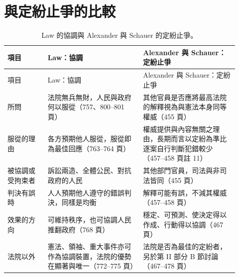 \section{與定紛止爭的比較}
\label{sec:60_coordination-2}

\begin{longtable}{@{}L{0.16\linewidth}L{0.38\linewidth}L{0.38\linewidth}@{}}
\caption{Law 的協調與 Alexander 與 Schauer 的定紛止爭。}\\
\toprule
項目 & Law：協調 & Alexander 與 Schauer：定紛止爭 \\
\midrule
\endfirsthead
\toprule
項目 & Law：協調 & Alexander 與 Schauer：定紛止爭 \\
\midrule
\endhead
所問 & 法院無兵無財，人民與政府何以服從（757、800--801 頁） & 其他官員是否應將最高法院的解釋視為與憲法本身同等權威（455 頁） \\
服從的理由 & 各方預期他人服從，服從即為最佳回應（763--764 頁） & 權威提供與內容無關之理由，長期而言以定紛為準比逐案自行判斷犯錯較少（457--458 頁註 11） \\
被協調或受拘束者 & 訴訟兩造、全體公民、對抗政府的人民 & 其他部門官員，司法與非司法皆同（455 頁） \\
判決有誤時 & 人人預期他人遵守的錯誤判決，同樣是均衡 & 解釋可能有誤，不減其權威（457--458 頁） \\
效果的方向 & 可維持秩序，也可協調人民推翻政府（768 頁） & 穩定、可預測、使決定得以作成、行動得以協調（467 頁） \\
法院以外 & 憲法、領袖、重大事件亦可作為協調裝置，法院的優勢在顯著與唯一（772--775 頁） & 法院是否為最佳的定紛者，另於第 II 部分 B 節討論（467--478 頁） \\
\bottomrule
\end{longtable}

